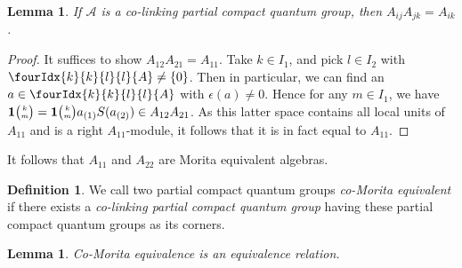 \documentclass[10pt]{article}
\newcommand{\Grt}[3]{#1{\tiny {\begin{pmatrix} #2\\#3\end{pmatrix}}}}
\newcommand{\UnitC}[2]{\Grt{\mathbf{1}}{#1}{#2}}
\newcommand{\Gr}[5]{\fourIdx{#2}{#4}{#3}{#5}{#1}}%
\newtheorem{Lem}[Theorem]{Lemma}
\theoremstyle{definition}
\newtheorem{Def}[Theorem]{Definition}
\numberwithin{equation}{section}
\begin{document}
\begin{Lem}  If $\mathscr{A}$ is a co-linking partial compact quantum group, then  $A_{ij}A_{jk} = A_{ik}$.
\end{Lem}
\begin{proof} It suffices to show $A_{12}A_{21} = A_{11}$. Take $k\in I_1$, and pick $l\in I_2$ with $\Gr{A}{k}{l}{k}{l}\neq \{0\}$. Then in particular, we can find an $a\in \Gr{A}{k}{l}{k}{l}$ with $\epsilon(a)\neq 0$. Hence for any $m\in I_1$, we have $\UnitC{k}{m} = \UnitC{k}{m} a_{(1)}S(a_{(2)}) \in A_{12}A_{21}$. As this latter space contains all local units of $A_{11}$ and is a right $A_{11}$-module, it follows that it is in fact equal to $A_{11}$. 
\end{proof}

It follows that $A_{11}$ and $A_{22}$ are Morita equivalent algebras.

\begin{Def} We call two partial compact quantum groups \emph{co-Morita equivalent} if there exists a \emph{co-linking partial compact quantum group} having these partial compact quantum groups as its corners.
\end{Def}


\begin{Lem} Co-Morita equivalence is an equivalence relation. 
\end{Lem} 
\end{document}
